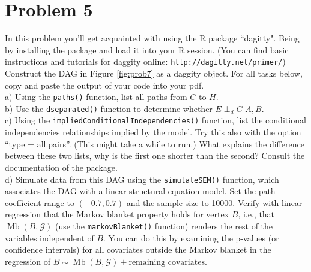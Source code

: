 \documentclass[letterpaper]{article}
\DeclareMathOperator*{\Mb}{\text{Mb}}
\begin{document}
\section*{Problem 5}

In this problem you'll get acquainted with using the R package ``dagitty". Being by installing the package and load it into your R session. (You can find basic instructions and tutorials for daggity online: \texttt{http://dagitty.net/primer/}) \\

Construct the DAG in Figure \ref{fig:prob7} as a daggity object. For all tasks below, copy and paste the output of your code into your pdf.\\

a) Using the \texttt{paths()} function, list all paths from $C$ to $H$. \\

b) Use the \texttt{dseparated()} function to determine whether $E \perp_d G | A, B$.\\

c) Using the \texttt{impliedConditionalIndependencies()} function, list the conditional independencies relationships implied by the model. Try this also with the option ``type = all.pairs''. (This might take a while to run.) What explains the difference between these two lists, why is the first one shorter than the second? Consult the documentation of the package.\\

d) Simulate data from this DAG using the \texttt{simulateSEM()} function, which associates the DAG with a linear structural equation model. Set the path coefficient range to $(-0.7, 0.7)$ and the sample size to 10000. Verify with linear regression that the Markov blanket property holds for vertex $B$, i.e., that $\Mb(B,\mathcal{G})$ (use the \texttt{markovBlanket()} function) renders the rest of the variables independent of $B$. You can do this by examining the p-values (or confidence intervals) for all covariates outside the Markov blanket in the regression of $B \sim \Mb(B,\mathcal{G}) + \mbox{remaining covariates}$.
\end{document}
